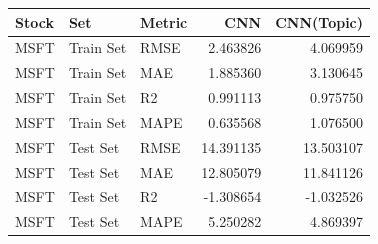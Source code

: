 \begin{tabular}{lllrr}
\toprule
Stock & Set & Metric & CNN & CNN(Topic) \\
\midrule
MSFT & Train Set & RMSE & 2.463826 & 4.069959 \\
MSFT & Train Set & MAE & 1.885360 & 3.130645 \\
MSFT & Train Set & R2 & 0.991113 & 0.975750 \\
MSFT & Train Set & MAPE & 0.635568 & 1.076500 \\
MSFT & Test Set & RMSE & 14.391135 & 13.503107 \\
MSFT & Test Set & MAE & 12.805079 & 11.841126 \\
MSFT & Test Set & R2 & -1.308654 & -1.032526 \\
MSFT & Test Set & MAPE & 5.250282 & 4.869397 \\
\bottomrule
\end{tabular}
